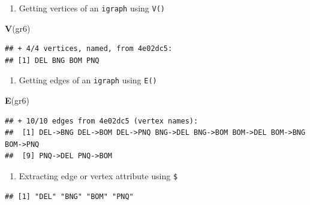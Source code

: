 \documentclass[
]{book}
\newenvironment{Shaded}{\begin{snugshade}}{\end{snugshade}}
\newcommand{\CommentTok}[1]{\textcolor[rgb]{0.56,0.35,0.01}{\textit{#1}}}
\newcommand{\FunctionTok}[1]{\textcolor[rgb]{0.13,0.29,0.53}{\textbf{#1}}}
\newcommand{\NormalTok}[1]{#1}
\newcommand{\SpecialCharTok}[1]{\textcolor[rgb]{0.81,0.36,0.00}{\textbf{#1}}}
\providecommand{\tightlist}{%
  \setlength{\itemsep}{0pt}\setlength{\parskip}{0pt}}
\begin{document}
\begin{enumerate}
\def\labelenumi{\arabic{enumi}.}
\tightlist
\item
  Getting vertices of an \texttt{igraph} using \texttt{V()}
\end{enumerate}

\begin{Shaded}
\begin{Highlighting}[]
\FunctionTok{V}\NormalTok{(gr6)}
\end{Highlighting}
\end{Shaded}

\begin{verbatim}
## + 4/4 vertices, named, from 4e02dc5:
## [1] DEL BNG BOM PNQ
\end{verbatim}

\begin{enumerate}
\def\labelenumi{\arabic{enumi}.}
\setcounter{enumi}{1}
\tightlist
\item
  Getting edges of an \texttt{igraph} using \texttt{E()}
\end{enumerate}

\begin{Shaded}
\begin{Highlighting}[]
\FunctionTok{E}\NormalTok{(gr6)}
\end{Highlighting}
\end{Shaded}

\begin{verbatim}
## + 10/10 edges from 4e02dc5 (vertex names):
##  [1] DEL->BNG DEL->BOM DEL->PNQ BNG->DEL BNG->BOM BOM->DEL BOM->BNG BOM->PNQ
##  [9] PNQ->DEL PNQ->BOM
\end{verbatim}

\begin{enumerate}
\def\labelenumi{\arabic{enumi}.}
\setcounter{enumi}{2}
\tightlist
\item
  Extracting edge or vertex attribute using \texttt{\$}
\end{enumerate}

\begin{Shaded}
\end{Shaded}

\begin{verbatim}
## [1] "DEL" "BNG" "BOM" "PNQ"
\end{verbatim}
\end{document}
